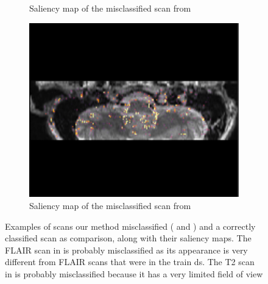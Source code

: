 \begin{figure}[htbp]
\begin{subfigure}[t]{0.25\textwidth}
        \caption{Saliency map of the misclassified \gls{scan} from }\label{fig:RIDER_FLAIR_saliency}
    \end{subfigure}
    \hfill
    \begin{subfigure}[t]{0.25\textwidth}
        \centering
        \includegraphics[width=\textwidth]{Figures/Appendix/Saliency_T2_hippo.png}
        \caption{Saliency map of the misclassified \gls{scan} from }\label{fig:T2_hippo_saliency}
    \end{subfigure}

\caption{Examples of \glspl{scan} our method misclassified ( and ) and a correctly classified \gls{scan}  as comparison, along with their saliency maps.
The \gls{FLAIR} \gls{scan} in  is probably misclassified as its appearance is very different from \gls{FLAIR} \glspl{scan} that were in the train \gls{ds}.
The \gls{T2} \gls{scan} in  is probably misclassified because it has a very limited field of view}\label{fig:FLAIR_comparison}

\end{figure}

